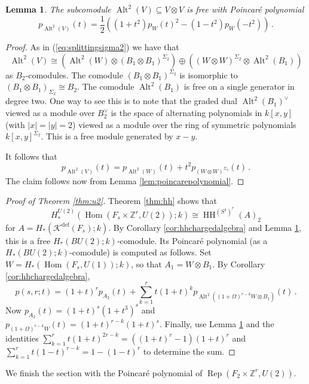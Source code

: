 \documentclass[oneside, a4paper, 12pt]{article}
\numberwithin{equation}{section}
\DeclareMathOperator{\Rep}{Rep}
\DeclareMathOperator{\Hom}{Hom}
\DeclareMathOperator{\HH}{HH}
\DeclareMathOperator{\Alt}{Alt}
\newcommand{\Kdef}{\mathcal{K}^{\mathrm{def}}}
\newcommand{\Z}{\mathbb{Z}}
\theoremstyle{plain}
\newtheorem{lemma}[theorem]{Lemma}
\theoremstyle{definition}
\theoremstyle{remark}
\begin{document}
\begin{lemma} \label{lem:alt2cofree}
The subcomodule $\Alt^2(V)\subseteq V\otimes V$ is free with Poincar{\'e} polynomial
\[
p_{\Alt^2(V)}(t)=\frac{1}{2}((1+t^2)p_W(t)^2-(1-t^2)p_W(-t^2))\, .
\]
\end{lemma}
\begin{proof}
As in (\ref{eq:splittingsigma2}) we have that
\[
\Alt^2(V) \cong (\Alt^2(W)\otimes (B_1\otimes B_1)^{\Sigma_2}) \oplus ((W\otimes W)^{\Sigma_2}\otimes \Alt^2(B_1))
\]
as $B_2$-comodules. The comodule $(B_1\otimes B_1)^{\Sigma_2}$ is isomorphic to $(B_1\otimes B_1)_{\Sigma_2}\cong B_2$. The comodule $\Alt^2(B_1)$ is free on a single generator in degree two. One way to see this is to note that the graded dual $\Alt^2(B_1)^\vee$ viewed as a module over $B_2^\vee$ is the space of alternating polynomials in $k[x,y]$ (with $|x|=|y|=2$) viewed as a module over the ring of symmetric polynomials $k[x,y]^{\Sigma_2}$. This is a free module generated by $x-y$.

It follows that
\[
p_{\Alt^2(V)}(t)=p_{\Alt^2(W)}(t)+t^2 p_{(W\otimes W)^{\Sigma_2}}(t)\, .
\]
The claim follows now from Lemma \ref{lem:poincarepolynomial}.
\end{proof}


\begin{proof}[Proof of Theorem \ref{thm:u2}]
Theorem \ref{thm:hh} shows that
\[
H_\ast^{U(2)}(\Hom(F_s\times \Z^r,U(2));k)\cong \HH^{(S^1)^r}(A)_2
\]
for $A=H_\ast(\Kdef(F_s);k)$. By Corollary \ref{cor:hhchargedalgebra} and Lemma \ref{lem:alt2cofree}, this is a free $H_\ast(BU(2);k)$-comodule. Its Poincar{\'e} polynomial (as a $H_\ast(BU(2);k)$-comodule) is computed as follows. Set $W=H_\ast(\Hom(F_s,U(1));k)$, so that $A_1=W\otimes B_1$. By Corollary \ref{cor:hhchargedalgebra}, 
\[
p(s,r;t) =(1+t)^r p_{A_2}(t)+\sum_{k=1}^r t(1+t)^k p_{\Alt^2((1+\Omega)^{r-k}W\otimes B_1)}(t) \, .
\]
Now $p_{A_2}(t)=(1+t)^s (1+t^3)^s$ and $p_{(1+\Omega)^{r-k}W}(t)=(1+t)^{r-k}(1+t)^s$. Finally, use Lemma \ref{lem:alt2cofree} and the identities $\sum_{k=1}^r t(1+t)^{2r-k}=((1+t)^r-1)(1+t)^r$ and $\sum_{k=1}^r t(1-t)^{r-k}=1-(1-t)^r$ to determine the sum.
\end{proof}




We finish the section with the Poincar{\'e} polynomial of $\Rep(F_2\times \Z^r,U(2))$.
\end{document}
